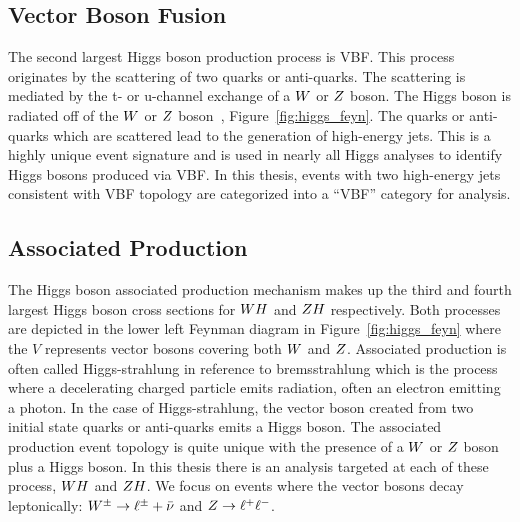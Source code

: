 \subsection{Vector Boson Fusion}
The second largest Higgs boson production process is VBF. This process originates by
the scattering of two quarks or anti-quarks. The scattering is mediated by the t-
or u-channel exchange of a $W$ or $Z$ boson. The Higgs boson is radiated off
of the $W$ or $Z$ boson~\cite{PhysRevD.70.113009}, Figure~\ref{fig:higgs_feyn}. 
The quarks or anti-quarks which are scattered
lead to the generation of high-energy jets.
This is a highly unique event signature and is used in nearly all Higgs analyses
to identify Higgs bosons produced via VBF. In this thesis, events with two high-energy
jets consistent with VBF topology are categorized into a ``VBF'' category for analysis.


\subsection{Associated Production}
The Higgs boson associated production mechanism makes up the third and fourth largest
Higgs boson cross sections for $WH$ and $ZH$ respectively. Both processes are 
depicted in the lower left Feynman diagram in Figure~\ref{fig:higgs_feyn} where
the $V$ represents vector bosons covering both $W$ and $Z$. Associated
production is often called Higgs-strahlung in reference to bremsstrahlung which is the
process where a decelerating charged particle emits radiation, often an electron
emitting a photon. In the case of Higgs-strahlung, the vector boson created 
from two initial state quarks or anti-quarks emits a Higgs boson. The associated
production event topology is quite unique with the presence of a $W$ or $Z$
boson plus a Higgs boson. In this thesis there is an analysis targeted at each
of these process, $WH$ and $ZH$. We focus on events where the vector
bosons decay leptonically: $W^{\pm} \to \ell^{\pm} + \bar{\nu}$ and $Z \to \ell^{+}\ell^{-}$.



